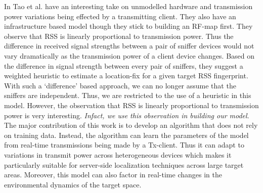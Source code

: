In \cite{Tao:2003:WLL:941311.941314} Tao et al. have an interesting take on unmodelled hardware and transmission power variations being effected by a transmitting client. They also have an infrastructure based model though they stick to building an RF-map first. They observe that RSS is linearly proportional to transmission power. Thus the difference in received signal strengths between a pair of sniffer devices would not vary dramatically as the transmission power of a client device changes. Based on the difference in signal strength between every pair of sniffers, they suggest a weighted heuristic to estimate a location-fix for a given target RSS fingerprint. With such a `difference' based approach, we can no longer assume that the sniffers are independent. Thus, we are restricted to the use of a heuristic in this model. However, the observation that RSS is linearly proportional to transmission power is very interesting. {\it Infact, we use this observation in building our model}.\\

 The major contribution of this work is to develop an algorithm that does not rely on training data. Instead, the algorithm can learn the parameters of the model from real-time transmissions being made by a Tx-client. Thus it can adapt to variations in transmit power across heterogeneous devices which makes it particularly suitable for server-side localization techniques across large target areas. Moreover, this model can also factor in real-time changes in the environmental dynamics of the target space. 